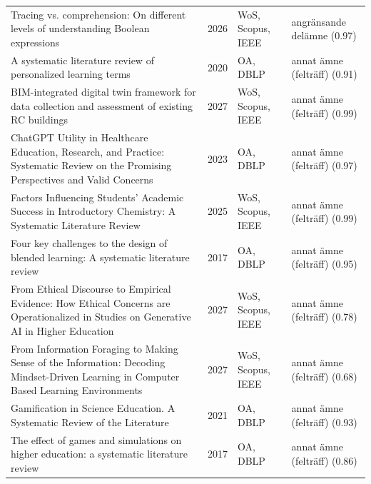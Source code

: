 \begin{longtable}{@{}%
  >{\raggedright\arraybackslash}p{}c%
  >{\raggedright\arraybackslash}p{}%
  >{\raggedright\arraybackslash}p{}@{}}
Tracing vs. comprehension: On different levels of understanding Boolean expressions & 2026 & WoS, Scopus, IEEE & angränsande delämne (0.97) \\
A systematic literature review of personalized learning terms & 2020 & OA, DBLP & annat ämne (felträff) (0.91) \\
BIM-integrated digital twin framework for data collection and assessment of existing RC buildings & 2027 & WoS, Scopus, IEEE & annat ämne (felträff) (0.99) \\
ChatGPT Utility in Healthcare Education, Research, and Practice: Systematic Review on the Promising Perspectives and Valid Concerns & 2023 & OA, DBLP & annat ämne (felträff) (0.97) \\
Factors Influencing Students' Academic Success in Introductory Chemistry: A Systematic Literature Review & 2025 & WoS, Scopus, IEEE & annat ämne (felträff) (0.99) \\
Four key challenges to the design of blended learning: A systematic literature review & 2017 & OA, DBLP & annat ämne (felträff) (0.95) \\
From Ethical Discourse to Empirical Evidence: How Ethical Concerns are Operationalized in Studies on Generative AI in Higher Education & 2027 & WoS, Scopus, IEEE & annat ämne (felträff) (0.78) \\
From Information Foraging to Making Sense of the Information: Decoding Mindset-Driven Learning in Computer Based Learning Environments & 2027 & WoS, Scopus, IEEE & annat ämne (felträff) (0.68) \\
Gamification in Science Education. A Systematic Review of the Literature & 2021 & OA, DBLP & annat ämne (felträff) (0.93) \\
The effect of games and simulations on higher education: a systematic literature review & 2017 & OA, DBLP & annat ämne (felträff) (0.86) \\
\end{longtable}
\endgroup
